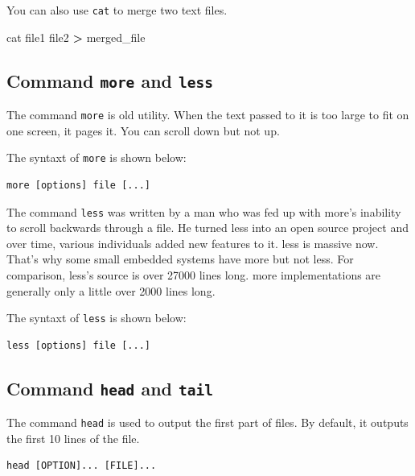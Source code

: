 \documentclass[]{book}
\makeatletter
\newenvironment{Shaded}{\begin{snugshade}}{\end{snugshade}}
\newcommand{\FunctionTok}[1]{\textcolor[rgb]{0.00,0.00,0.00}{#1}}
\newcommand{\OperatorTok}[1]{\textcolor[rgb]{0.81,0.36,0.00}{\textbf{#1}}}
\newcommand{\NormalTok}[1]{#1}
\newenvironment{kframe}{%
\medskip{}
\setlength{\fboxsep}{.8em}
 \def\at@end@of@kframe{}%
 \ifinner\ifhmode%
  \def\at@end@of@kframe{\end{minipage}}%
  \begin{minipage}{\columnwidth}%
 \fi\fi%
 \def\FrameCommand##1{\hskip\@totalleftmargin \hskip-\fboxsep
 \colorbox{shadecolor}{##1}\hskip-\fboxsep
     \hskip-\linewidth \hskip-\@totalleftmargin \hskip\columnwidth}%
 \MakeFramed {\advance\hsize-\width
   \@totalleftmargin\z@ \linewidth\hsize
   \@setminipage}}%
 {\par\unskip\endMakeFramed%
 \at@end@of@kframe}
\renewenvironment{Shaded}{\begin{kframe}}{\end{kframe}}
\theoremstyle{definition}
\theoremstyle{definition}
\theoremstyle{definition}
\theoremstyle{remark}
\makeatother
\begin{document}
You can also use \texttt{cat} to merge two text files.

\begin{Shaded}
\begin{Highlighting}[]
\FunctionTok{cat}\NormalTok{ file1 file2 }\OperatorTok{>}\NormalTok{ merged_file}
\end{Highlighting}
\end{Shaded}

\subsection{\texorpdfstring{Command \texttt{more} and
\texttt{less}}{Command more and less}}\label{command-more-and-less}

The command \texttt{more} is old utility. When the text passed to it is
too large to fit on one screen, it pages it. You can scroll down but not
up.

The syntaxt of \texttt{more} is shown below:

\begin{verbatim}
more [options] file [...]
\end{verbatim}

The command \texttt{less} was written by a man who was fed up with
more's inability to scroll backwards through a file. He turned less into
an open source project and over time, various individuals added new
features to it. less is massive now. That's why some small embedded
systems have more but not less. For comparison, less's source is over
27000 lines long. more implementations are generally only a little over
2000 lines long.

The syntaxt of \texttt{less} is shown below:

\begin{verbatim}
less [options] file [...]
\end{verbatim}

\subsection{\texorpdfstring{Command \texttt{head} and
\texttt{tail}}{Command head and tail}}\label{command-head-and-tail}

The command \texttt{head} is used to output the first part of files. By
default, it outputs the first 10 lines of the file.

\begin{verbatim}
head [OPTION]... [FILE]...
\end{verbatim}
\end{document}
